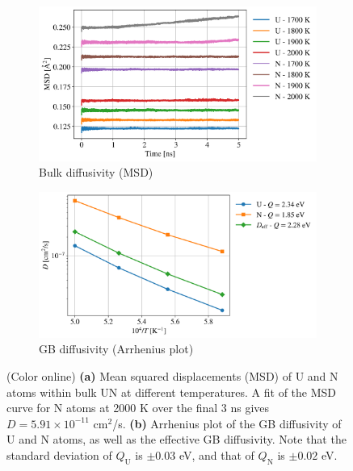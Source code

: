\documentclass[preprint,12pt,sort&compress]{elsarticle}
\newcommand{\?}{\stackrel{?}{=}}
\begin{document}
\begin{figure}[h!]
\centering
\begin{subfigure}{0.48\textwidth}
    \includegraphics[width=\textwidth]{LatticeDiffusion.png}
    \caption{Bulk diffusivity (MSD)}
    \label{Fig:LatDiff}
\end{subfigure}
\hfill
\begin{subfigure}{0.48\textwidth}
    \includegraphics[width=\textwidth]{GBDiffusion.png}
    \caption{GB diffusivity (Arrhenius plot)}
    \label{Fig:GBDiff}
\end{subfigure}
\caption{(Color online) \textbf{(a)} Mean squared displacements (MSD) of U and N atoms within bulk UN at different temperatures. A fit of the MSD curve for N atoms at 2000 K over the final 3 ns gives $D = 5.91 \times 10^{-11}$ cm$^2$/s. \textbf{(b)} Arrhenius plot of the GB diffusivity of U and N atoms, as well as the effective GB diffusivity. Note that the standard deviation of $Q_\mathrm{U}$ is $\pm 0.03$ eV, and that of $Q_\mathrm{N}$ is $\pm 0.02$ eV.}
\label{Fig:Diff}
\end{figure}
\end{document}
